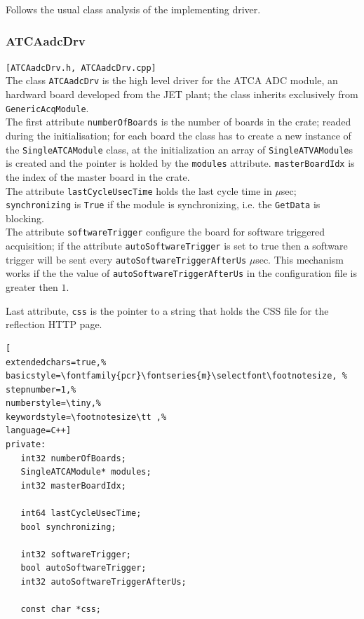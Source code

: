 Follows the usual class analysis of the implementing driver.



\subsubsection{ATCAadcDrv}
\texttt{[ATCAadcDrv.h, ATCAadcDrv.cpp]}\\
The class \texttt{ATCAadcDrv} is the high level driver for the ATCA ADC module, an hardward board developed from the JET plant; the class inherits exclusively from \texttt{GenericAcqModule}. \\


The first attribute \texttt{numberOfBoards} is the number of boards in the crate; readed during the initialisation; for each board the class has to create a new instance of the \texttt{SingleATCAModule} class, at the initialization an array of \texttt{SingleATVAModule}s is created and the pointer is holded by the \texttt{modules} attribute. \texttt{masterBoardIdx} is the index of the master board in the crate. \\


The attribute \texttt{lastCycleUsecTime} holds the last cycle time in $\mu$sec; \texttt{synchronizing} is \texttt{True} if the module is synchronizing, i.e. the \texttt{GetData} is blocking. \\


The attribute \texttt{softwareTrigger} configure the board for software triggered acquisition; if the attribute \texttt{autoSoftwareTrigger} is set to true then a software trigger will be sent every \texttt{autoSoftwareTriggerAfterUs} $\mu$sec. This mechanism works if the the value of \texttt{autoSoftwareTriggerAfterUs} in the configuration file is greater then $1$.

Last attribute, \texttt{css} is the pointer to a string that holds the CSS file for the reflection HTTP page. \\

\begin{lstlisting}[
extendedchars=true,%
basicstyle=\fontfamily{pcr}\fontseries{m}\selectfont\footnotesize, %
stepnumber=1,%
numberstyle=\tiny,%
keywordstyle=\footnotesize\tt ,%
language=C++]
private:
   int32 numberOfBoards;
   SingleATCAModule* modules;
   int32 masterBoardIdx;

   int64 lastCycleUsecTime;
   bool synchronizing;

   int32 softwareTrigger;
   bool autoSoftwareTrigger;
   int32 autoSoftwareTriggerAfterUs;

   const char *css;
\end{lstlisting}

